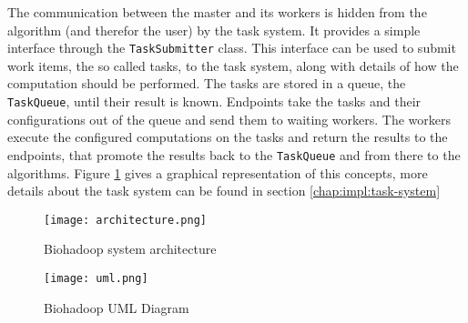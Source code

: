   The communication between the master and its workers is hidden from the algorithm (and therefor the user) by the task system. It provides a simple interface through the \texttt{TaskSubmitter} class. This interface can be used to submit work items, the so called tasks, to the task system, along with details of how the computation should be performed. The tasks are stored in a queue, the \texttt{TaskQueue}, until their result is known. Endpoints take the tasks and their configurations out of the queue and send them to waiting workers. The workers execute the configured computations on the tasks and return the results to the endpoints, that promote the results back to the \texttt{TaskQueue} and from there to the algorithms. Figure \ref{fig:architecture} gives a graphical representation of this concepts, more details about the task system can be found in section \ref{chap:impl:task-system}
  
  \begin{figure}[ht!]
    \centering
    \texttt{[image: architecture.png]}
    \caption{Biohadoop system architecture}
    \label{fig:architecture}
  \end{figure}
  
  

  
  \begin{figure}[ht!]
    \centering
    \texttt{[image: uml.png]}
    \caption{Biohadoop UML Diagram}
    \label{fig:uml}
  \end{figure}
  
  
